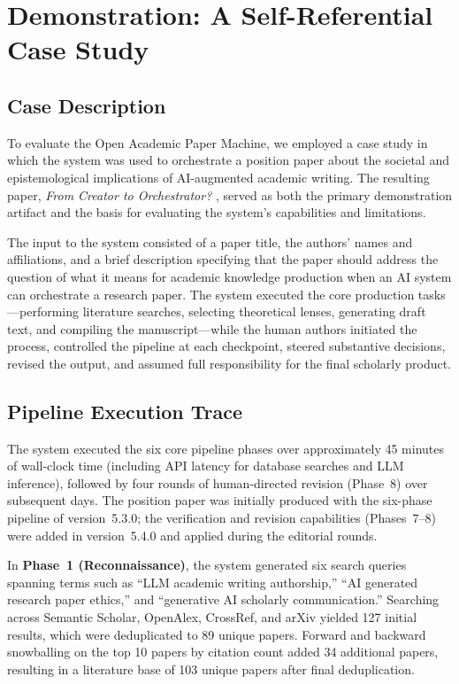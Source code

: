 \documentclass{article}
\begin{document}
\section{Demonstration: A Self-Referential Case Study}

\subsection{Case Description}

To evaluate the Open Academic Paper Machine, we employed a case study in which the system was used to orchestrate a position paper about the societal and epistemological implications of AI-augmented academic writing. The resulting paper, \emph{From Creator to Orchestrator?} \citep{blask2026creator}, served as both the primary demonstration artifact and the basis for evaluating the system's capabilities and limitations.

The input to the system consisted of a paper title, the authors' names and affiliations, and a brief description specifying that the paper should address the question of what it means for academic knowledge production when an AI system can orchestrate a research paper. The system executed the core production tasks---performing literature searches, selecting theoretical lenses, generating draft text, and compiling the manuscript---while the human authors initiated the process, controlled the pipeline at each checkpoint, steered substantive decisions, revised the output, and assumed full responsibility for the final scholarly product.

\subsection{Pipeline Execution Trace}

The system executed the six core pipeline phases over approximately 45 minutes of wall-clock time (including API latency for database searches and LLM inference), followed by four rounds of human-directed revision (Phase~8) over subsequent days. The position paper was initially produced with the six-phase pipeline of version~5.3.0; the verification and revision capabilities (Phases~7--8) were added in version~5.4.0 and applied during the editorial rounds.

In \textbf{Phase~1 (Reconnaissance)}, the system generated six search queries spanning terms such as ``LLM academic writing authorship,'' ``AI generated research paper ethics,'' and ``generative AI scholarly communication.'' Searching across Semantic Scholar, OpenAlex, CrossRef, and arXiv yielded 127 initial results, which were deduplicated to 89 unique papers. Forward and backward snowballing on the top 10 papers by citation count added 34 additional papers, resulting in a literature base of 103 unique papers after final deduplication.
\end{document}

